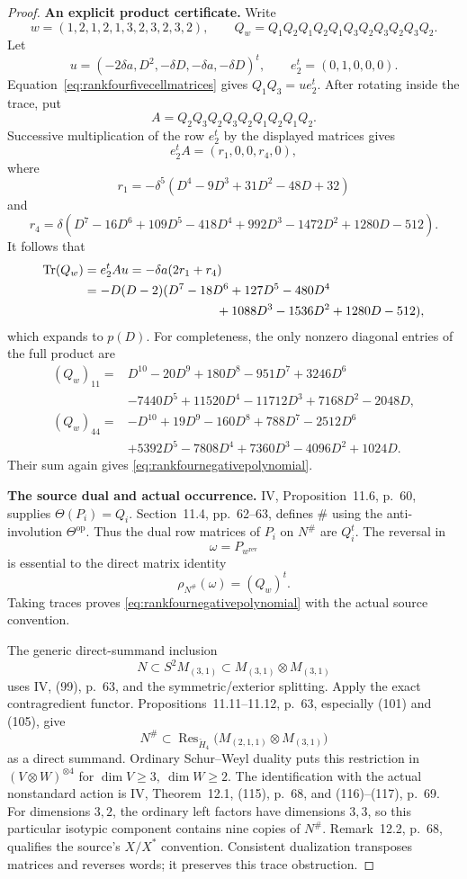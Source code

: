 \begin{proof}
\par\smallskip\noindent\textbf{An explicit product certificate.}\quad
Write
\[
 w=(1,2,1,2,1,3,2,3,2,3,2),\qquad
 Q_w=Q_1Q_2Q_1Q_2Q_1Q_3Q_2Q_3Q_2Q_3Q_2.
\]
Let
\[
 u=(-2\delta a,D^2,-\delta D,-\delta a,-\delta D)^t,
 \qquad e_2^t=(0,1,0,0,0).
\]
Equation~\eqref{eq:rankfourfivecellmatrices} gives
\(Q_1Q_3=ue_2^t\). After rotating inside the trace, put
\[
 A=Q_2Q_3Q_2Q_3Q_2Q_1Q_2Q_1Q_2.
\]
Successive multiplication of the row \(e_2^t\) by the
displayed matrices gives
\[
 e_2^tA=(r_1,0,0,r_4,0),
\]
where
\[
 r_1=-\delta^5(D^4-9D^3+31D^2-48D+32)
\]
and
\[
 r_4=\delta(D^7-16D^6+109D^5-418D^4
                 +992D^3-1472D^2+1280D-512).
\]
It follows that
\begin{align*}
 \operatorname{Tr}(Q_w)
 &=e_2^tAu=-\delta a(2r_1+r_4)\\
 &=-D(D-2)(D^7-18D^6+127D^5-480D^4\\
 &\hspace{37mm}+1088D^3-1536D^2+1280D-512),
\end{align*}
which expands to \(p(D)\).
For completeness, the only nonzero diagonal entries of
the full product are
\[
\begin{aligned}
(Q_w)_{11}={}&D^{10}-20D^9+180D^8-951D^7+3246D^6\\
&-7440D^5+11520D^4-11712D^3+7168D^2-2048D,\\
(Q_w)_{44}={}&-D^{10}+19D^9-160D^8+788D^7-2512D^6\\
&+5392D^5-7808D^4+7360D^3-4096D^2+1024D.
\end{aligned}
\]
Their sum again gives
\eqref{eq:rankfournegativepolynomial}.

\par\smallskip\noindent\textbf{The source dual and actual occurrence.}\quad
IV, Proposition~11.6, p.~60, supplies \(\Theta(P_i)=Q_i\).
Section~11.4, pp.~62--63, defines \(\#\) using the
anti-involution \(\Theta^{\mathrm{op}}\).
Thus the dual row matrices of \(P_i\) on \(N^\#\) are \(Q_i^t\).
The reversal in
\[
 \omega=P_{w^{\mathrm{rev}}}
\]
is essential to the direct matrix identity
\[
 \rho_{N^\#}(\omega)=(Q_w)^t.
\]
Taking traces proves
\eqref{eq:rankfournegativepolynomial} with the actual
source convention.

The generic direct-summand inclusion
\[
 N\subset S^2M_{(3,1)}
      \subset M_{(3,1)}\otimes M_{(3,1)}
\]
uses IV, (99), p.~63, and the symmetric/exterior splitting.
Apply the exact contragredient functor.
Propositions~11.11--11.12, p.~63, especially (101) and (105),
give
\[
 N^\#\subset
 \operatorname{Res}_{\check H_4}
   \big(M_{(2,1,1)}\otimes M_{(3,1)}\big)
\]
as a direct summand.
Ordinary Schur--Weyl duality puts this restriction in
\((V\otimes W)^{\otimes4}\) for \(\dim V\ge3,\ \dim W\ge2\).
The identification with the actual nonstandard action is
IV, Theorem~12.1, (115), p.~68, and (116)--(117), p.~69.
For dimensions \(3,2\), the ordinary left factors have
dimensions \(3,3\), so this particular isotypic component
contains nine copies of \(N^\#\).
Remark~12.2, p.~68, qualifies the source's \(X/X^*\)
convention. Consistent dualization transposes matrices and
reverses words; it preserves this trace obstruction.


\end{proof}

